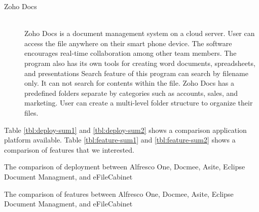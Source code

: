 \begin{description}
\item[Zoho Docs] \hfill \\
Zoho Docs is a document management system on a cloud server.
User can access the file anywhere on their smart phone device.
The software encourages real-time collaboration among other team members.
The program also has its own tools for creating word documents, spreadsheets, and presentations
Search feature of this program can search by filename only.
It can not search for contents within the file.
Zoho Docs has a predefined folders separate by categories such as accounts, sales, and marketing.
User can create a multi-level folder structure to organize their files.
\end{description}

Table \ref{tbl:deploy-sum1} and \ref{tbl:deploy-sum2} shows a comparison application platform available.
Table \ref{tbl:feature-sum1} and \ref{tbl:feature-sum2} shows a comparison of features that we interested.

\newpage

\begin{table}
    
    \caption{The comparison of deployment between Alfresco One, Docmee, Asite, Eclipse Document Managment, and eFileCabinet}
    \label{tbl:deploy-sum1}
\end{table}

\vspace{1.5cm}

\begin{table}
    
    \caption{The comparison of features between Alfresco One, Docmee, Asite, Eclipse Document Managment, and eFileCabinet}
    \label{tbl:feature-sum1}
\end{table}

